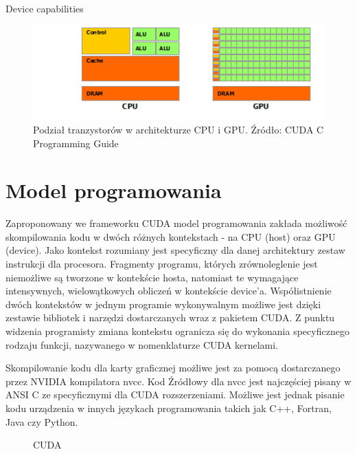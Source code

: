 Device capabilities

\begin{figure}[ht]\label{cpugpu}
\centering
\includegraphics{images/gpu-devotes-more-transistors-to-data-processing.png}
\caption{Podział tranzystorów w architekturze CPU i GPU. Źródło: CUDA C Programming Guide}
\end{figure}


\section{Model programowania}

Zaproponowany we frameworku CUDA model programowania zakłada możliwość
skompilowania kodu w dwóch różnych kontekstach - na CPU (host) oraz GPU
(device). Jako kontekst rozumiany jest specyficzny dla danej architektury zestaw
instrukcji dla procesora. Fragmenty programu, których zrównoleglenie jest
niemożliwe są tworzone w kontekście hosta, natomiast te wymagające intensywnych,
wielowątkowych obliczeń w kontekście device'a. Współistnienie dwóch
kontekstów w jednym programie wykonywalnym możliwe jest dzięki zestawie
bibliotek i narzędzi dostarczanych wraz z pakietem CUDA. Z punktu widzenia
programisty zmiana kontekstu ogranicza się do wykonania specyficznego
rodzaju funkcji, nazywanego w nomenklaturze CUDA kernelami.

Skompilowanie kodu dla karty graficznej możliwe jest za pomocą dostarczanego
przez NVIDIA kompilatora nvcc. Kod Źródłowy dla nvcc jest najczęściej pisany w
ANSI C ze specyficznymi dla CUDA rozszerzeniami. Możliwe jest jednak pisanie
kodu urządzenia w innych językach programowania takich jak C++, Fortran, Java
czy Python. 

\begin{figure}[ht]
\centering

\caption{CUDA}
\label{cuda-model}
\end{figure}


